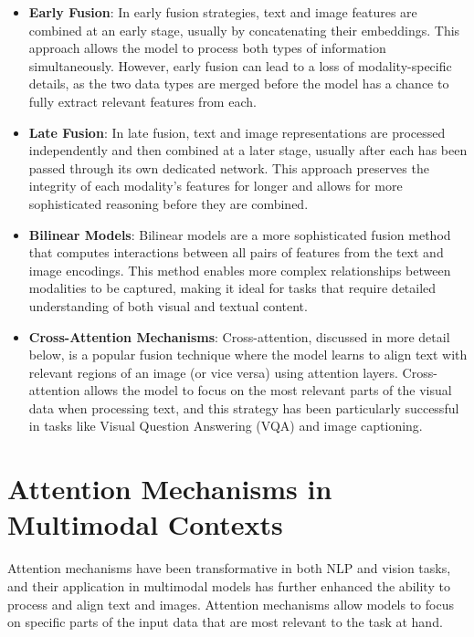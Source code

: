 \begin{itemize}
    \item \textbf{Early Fusion}: In early fusion strategies, text and image features are combined at an early stage, usually by concatenating their embeddings. This approach allows the model to process both types of information simultaneously. However, early fusion can lead to a loss of modality-specific details, as the two data types are merged before the model has a chance to fully extract relevant features from each.
    \item \textbf{Late Fusion}: In late fusion, text and image representations are processed independently and then combined at a later stage, usually after each has been passed through its own dedicated network. This approach preserves the integrity of each modality’s features for longer and allows for more sophisticated reasoning before they are combined.
    \item \textbf{Bilinear Models}: Bilinear models are a more sophisticated fusion method that computes interactions between all pairs of features from the text and image encodings. This method enables more complex relationships between modalities to be captured, making it ideal for tasks that require detailed understanding of both visual and textual content.
    \item \textbf{Cross-Attention Mechanisms}: Cross-attention, discussed in more detail below, is a popular fusion technique where the model learns to align text with relevant regions of an image (or vice versa) using attention layers. Cross-attention allows the model to focus on the most relevant parts of the visual data when processing text, and this strategy has been particularly successful in tasks like Visual Question Answering (VQA) and image captioning.
\end{itemize}

\section{Attention Mechanisms in Multimodal Contexts}

Attention mechanisms have been transformative in both NLP and vision tasks, and their application in multimodal models has further enhanced the ability to process and align text and images. Attention mechanisms allow models to focus on specific parts of the input data that are most relevant to the task at hand.


